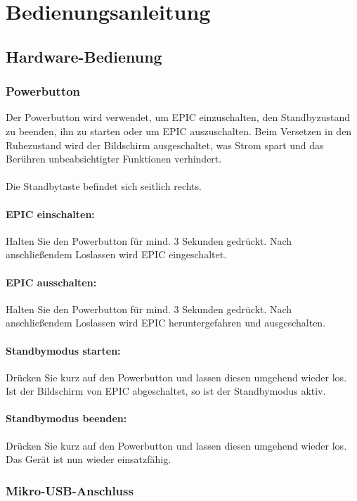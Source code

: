 \section{Bedienungsanleitung}

\subsection{Hardware-Bedienung}

\subsubsection{Powerbutton}

Der Powerbutton wird verwendet, um EPIC einzuschalten, den Standbyzustand zu beenden, ihn zu starten oder um EPIC auszuschalten. Beim Versetzen in den Ruhezustand wird der Bildschirm ausgeschaltet, was Strom spart und das Berühren unbeabsichtigter Funktionen verhindert.\\
\\
Die Standbytaste befindet sich seitlich rechts.


\paragraph{EPIC einschalten:}
Halten Sie den Powerbutton für mind. 3 Sekunden gedrückt. Nach anschließendem Loslassen wird EPIC eingeschaltet.

\paragraph{EPIC ausschalten:}
Halten Sie den Powerbutton für mind. 3 Sekunden gedrückt. Nach anschließendem Loslassen wird EPIC heruntergefahren und ausgeschalten.

\paragraph{Standbymodus starten:}
Drücken Sie kurz auf den Powerbutton und lassen diesen umgehend wieder los. Ist der Bildschirm von EPIC abgeschaltet, so ist der Standbymodus aktiv.

\paragraph{Standbymodus beenden:}
Drücken Sie kurz auf den Powerbutton und lassen diesen umgehend wieder los. Das Gerät ist nun wieder einsatzfähig.

\subsubsection{Mikro-USB-Anschluss}

